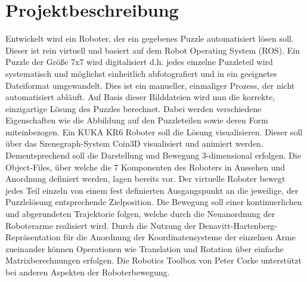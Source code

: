 \section[Projektbeschreibung]{Projektbeschreibung }
\graphicspath{{sections/MARVINWOLF/images/}}

Entwickelt wird ein Roboter, der ein gegebenes Puzzle automatisiert lösen soll. Dieser ist rein virtuell und basiert auf dem Robot Operating System (ROS).
\newline Ein Puzzle der Größe 7x7 wird digitalisiert d.h. jedes einzelne Puzzleteil wird systematisch und möglichst einheitlich abfotografiert und in ein geeignetes Dateiformat umgewandelt. Dies ist ein manueller, einmaliger Prozess, der nicht automatisiert abläuft.
\newline Auf Basis dieser Bilddateien wird nun die korrekte, einzigartige Lösung des Puzzles berechnet. Dabei werden verschiedene Eigenschaften wie die Abbildung auf den Puzzleteilen sowie deren Form miteinbezogen.
\newline Ein KUKA KR6 Roboter soll die Lösung visualisieren. Dieser soll über das Szenegraph-System Coin3D visualisiert und animiert werden. Dementsprechend soll die Darstellung und Bewegung 3-dimensional erfolgen. Die Object-Files, über welche die 7 Komponenten des Roboters in Aussehen und Anordnung definiert werden, lagen bereits vor. Der virtuelle Roboter bewegt jedes Teil einzeln von einem fest definierten Ausgangspunkt an die jeweilige, der Puzzlelösung entsprechende Zielposition. 
\newline Die Bewegung soll einer kontinuerlichen und abgerundeten Trajektorie folgen, welche durch die Neuanordnung der Roboterarme realisiert wird. Durch die Nutzung der Denavitt-Hartenberg-Repräsentation für die Anordnung der Koordinatensysteme der einzelnen Arme zueinander können Operationen wie Translation und Rotation über einfache Matrixberechnungen erfolgen. Die Robotics Toolbox von Peter Corke unterstützt bei anderen Aspekten der Roboterbewegung.